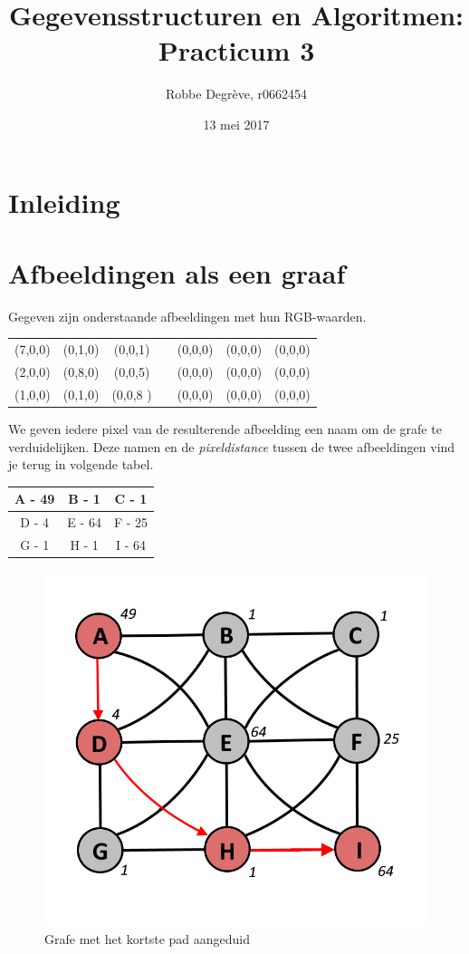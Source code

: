 \documentclass{article}
\title{Gegevensstructuren en Algoritmen: Practicum 3}
\author{Robbe Degr\`eve, r0662454}
\date{13 mei 2017}
\begin{document}
\maketitle
\newpage

\section*{Inleiding}

\newpage
\section{Afbeeldingen als een graaf}
Gegeven zijn onderstaande afbeeldingen met hun RGB-waarden.

\begin{tabular}{| c | c | c | c | c | c | c |}
\cline{1-3} \cline{5-7}
 (7,0,0) & (0,1,0) & (0,0,1) &  & (0,0,0) & (0,0,0) & (0,0,0)\\
  \cline{1-3} \cline{5-7}
 (2,0,0) & (0,8,0) & (0,0,5) &  & (0,0,0) & (0,0,0) & (0,0,0)\\
  \cline{1-3} \cline{5-7}
  (1,0,0) & (0,1,0) & (0,0,8 )&  & (0,0,0) & (0,0,0) & (0,0,0) \\
  \cline{1-3} \cline{5-7}
\end{tabular}

We geven iedere pixel van de resulterende afbeelding een naam om de grafe te verduidelijken. Deze namen en de \textit{pixeldistance} tussen de twee afbeeldingen vind je terug in volgende tabel.

\begin{tabular}{|c|c|c|}
  \hline
  A - 49 & B - 1 & C - 1 \\
  \hline
  D - 4 & E - 64 & F - 25 \\
  \hline
  G - 1 & H - 1 & I - 64 \\
  \hline
\end{tabular}

\begin{figure}[h!]
\centering
\includegraphics[scale=0.4]{Grafe.png}
\caption{Grafe met het kortste pad aangeduid}
\label{fig:Graph}
\end{figure}
\end{document}

